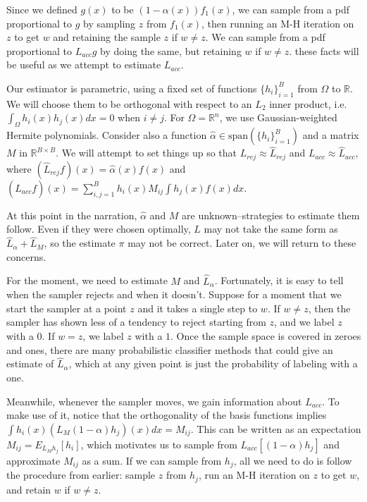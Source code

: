 \documentclass{article}
\begin{document}
Since we defined $g(x)$ to be $(1-\alpha(x))f_1(x)$, we can sample from a pdf proportional to $g$ by sampling $z$ from $f_1(x)$, then running an M-H iteration on $z$ to get $w$ and retaining the sample $z$ if $w \neq z$. We can sample from a pdf proportional to $L_{acc}g$ by doing the same, but retaining $w$ if $w \neq z$. these facts will be useful as we attempt to estimate $L_{acc}$.

Our estimator is parametric, using a fixed set of functions $\{h_i\}_{i=1}^B$ from $\Omega$ to $\mathbb{R}$. We will choose them to be orthogonal with respect to an $L_2$ inner product, i.e. $\int_{\Omega} h_i(x)h_j(x)dx = 0$ when $i \neq j$. For $\Omega=\mathbb{R}^n$, we use Gaussian-weighted Hermite polynomials. Consider also a function $\hat{\alpha} \in \text{span}(\{h_i\}_{i=1}^B)$ and a matrix $M$ in $\mathbb{R}^{B\times B}$.  We will attempt to set things up so that $L_{rej} \approx \hat{L}_{rej}$ and $L_{acc} \approx \hat{L}_{acc}$, where $ (\hat{L}_{rej}f)(x) = \hat{\alpha}(x)f(x)$ and $(\hat{L}_{acc}f)(x) =\sum_{i,j=1}^B h_i(x)M_{ij}\int h_j(x)f(x)dx$. 


At this point in the narration, $\hat{\alpha}$ and $M$ are unknown--strategies to estimate them follow. Even if they were chosen optimally, $L$ may not take the same form as $\hat{L}_{\alpha}+\hat{L}_{M}$, so the estimate $\pi$ may not be correct. Later on, we will return to these concerns.

For the moment, we need to estimate $M$ and $\hat{L}_{\alpha}$. Fortunately, it is easy to tell when the sampler rejects and when it doesn't. Suppose for a moment that we start the sampler at a point $z$ and it takes a single step to $w$. If $w \neq z$, then the sampler has shown less of a tendency to reject starting from $z$, and we label $z$ with a $0$. If $w = z$, we label $z$ with a $1$. Once the sample space is covered in zeroes and ones, there are many probabilistic classifier methods that could give an estimate of $\hat{L}_{\alpha}$, which at any given point is just the probability of labeling with a one. 

Meanwhile, whenever the sampler moves, we gain information about $L_{acc}$. To make use of it, notice that the orthogonality of the basis functions implies $\int h_i(x)(L_{M}(1-\alpha)h_j)(x)dx =  M_{ij}$. This can be written as an expectation $M_{ij} = E_{L_Mh_j}[h_i]$, which motivates us to sample from $L_{acc} [(1-\alpha)h_j]$ and approximate $M_{ij}$ as a sum. If we can sample from $h_j$, all we need to do is follow the procedure from earlier: sample $z$ from $h_j$, run an M-H iteration on $z$ to get $w$, and retain $w$ if $w \neq z$. 
\end{document}
